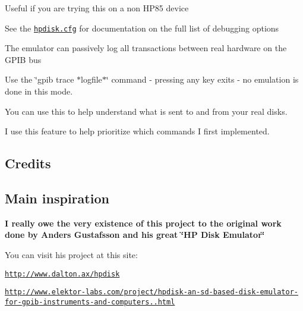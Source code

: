 \begin{DoxyItemize}
\begin{DoxyItemize}
\begin{DoxyItemize}
\begin{DoxyItemize}
\item Useful if you are trying this on a non H\+P85 device
\item See the \href{sdcard/hpdisk.cfg}{\tt hpdisk.\+cfg} for documentation on the full list of debugging options
\end{DoxyItemize}
\item The emulator can passively log all transactions between real hardware on the G\+P\+IB bus
\begin{DoxyItemize}
\item Use the \char`\"{}gpib trace $\ast$logfile$\ast$\char`\"{} command -\/ pressing any key exits -\/ no emulation is done in this mode.
\item You can use this to help understand what is sent to and from your real disks.
\item I use this feature to help prioritize which commands I first implemented. 


\end{DoxyItemize}
\end{DoxyItemize}
\end{DoxyItemize}
\end{DoxyItemize}

\subsection*{Credits}

\subsection*{Main inspiration}

{\bfseries I really owe the very existence of this project to the original work done by Anders Gustafsson and his great \char`\"{}\+H\+P Disk Emulator\char`\"{} }
\begin{DoxyItemize}
\item You can visit his project at this site\+:
\begin{DoxyItemize}
\item \href{http://www.dalton.ax/hpdisk}{\tt http\+://www.\+dalton.\+ax/hpdisk}
\item \href{http://www.elektor-labs.com/project/hpdisk-an-sd-based-disk-emulator-for-gpib-instruments-and-computers.13693.html}{\tt http\+://www.\+elektor-\/labs.\+com/project/hpdisk-\/an-\/sd-\/based-\/disk-\/emulator-\/for-\/gpib-\/instruments-\/and-\/computers..\+html}
\end{DoxyItemize}
\end{DoxyItemize}

